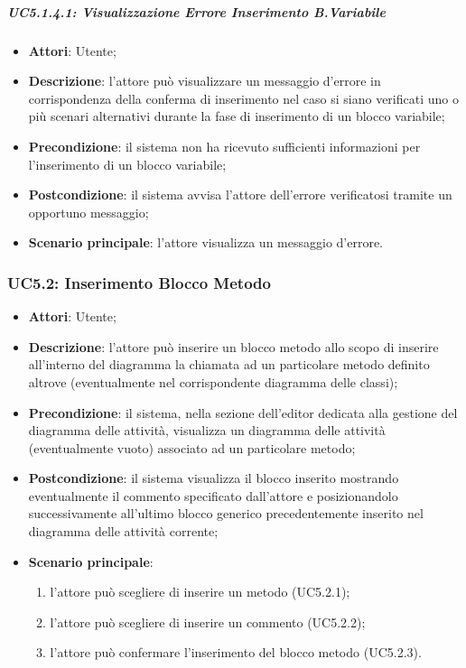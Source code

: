 \subparagraph{UC5.1.4.1: Visualizzazione Errore Inserimento B.Variabile	}
\label{UC5.1.4.1}
\begin{itemize}
\item \textbf{Attori}: Utente;
\item \textbf{Descrizione}: l'attore può visualizzare un messaggio d'errore in corrispondenza della conferma di inserimento nel caso si siano verificati uno o più scenari alternativi durante la fase di inserimento di un blocco variabile;	
\item \textbf{Precondizione}: il sistema non ha ricevuto sufficienti informazioni per l'inserimento di un blocco variabile;	
\item \textbf{Postcondizione}: il sistema avvisa l'attore dell'errore verificatosi tramite un opportuno messaggio;	
\item \textbf{Scenario principale}:
l'attore visualizza un messaggio d'errore.	
\end{itemize}

\subsubsection{UC5.2: Inserimento Blocco Metodo}
\label{UC5.2}
\begin{itemize}
\item \textbf{Attori}: Utente;
\item \textbf{Descrizione}: l'attore può inserire un blocco metodo allo scopo di inserire all'interno del diagramma la chiamata ad un particolare metodo definito altrove (eventualmente nel corrispondente diagramma delle classi);	
\item \textbf{Precondizione}: il sistema, nella sezione dell'editor dedicata alla gestione del diagramma delle attività, visualizza un diagramma delle attività (eventualmente vuoto) associato ad un particolare metodo;	
\item \textbf{Postcondizione}:  il sistema visualizza il blocco inserito mostrando eventualmente il commento specificato dall'attore e posizionandolo successivamente all'ultimo blocco generico precedentemente inserito nel diagramma delle attività corrente;
\item \textbf{Scenario principale}:
\begin{enumerate}
\item l'attore può scegliere di inserire un metodo (UC5.2.1);
\item l'attore può scegliere di inserire un commento (UC5.2.2);
\item l'attore può confermare l'inserimento del blocco metodo (UC5.2.3).
\end{enumerate}
\end{itemize}

